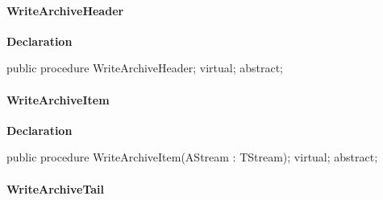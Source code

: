 \documentclass{report}
\newif\ifpdf
\begin{document}
\paragraph*{WriteArchiveHeader}\hspace*{\fill}

\label{AbArcTyp.TAbArchiveStreamHelper-WriteArchiveHeader}
\begin{list}{}{
\setlength{\itemindent}{0cm}
\setlength{\listparindent}{0cm}
\setlength{\leftmargin}{\evensidemargin}
\addtolength{\leftmargin}{\tmplength}
\settowidth{\labelsep}{X}
\addtolength{\leftmargin}{\labelsep}
\setlength{\labelwidth}{\tmplength}
}
\item[\textbf{Declaration}\hfill]
\ifpdf
\begin{flushleft}
\fi
\begin{ttfamily}
public procedure WriteArchiveHeader; virtual; abstract;\end{ttfamily}

\ifpdf
\end{flushleft}
\fi

\end{list}
\paragraph*{WriteArchiveItem}\hspace*{\fill}

\label{AbArcTyp.TAbArchiveStreamHelper-WriteArchiveItem}
\begin{list}{}{
\setlength{\itemindent}{0cm}
\setlength{\listparindent}{0cm}
\setlength{\leftmargin}{\evensidemargin}
\addtolength{\leftmargin}{\tmplength}
\settowidth{\labelsep}{X}
\addtolength{\leftmargin}{\labelsep}
\setlength{\labelwidth}{\tmplength}
}
\item[\textbf{Declaration}\hfill]
\ifpdf
\begin{flushleft}
\fi
\begin{ttfamily}
public procedure WriteArchiveItem(AStream : TStream); virtual; abstract;\end{ttfamily}

\ifpdf
\end{flushleft}
\fi

\end{list}
\paragraph*{WriteArchiveTail}\hspace*{\fill}
\end{document}
